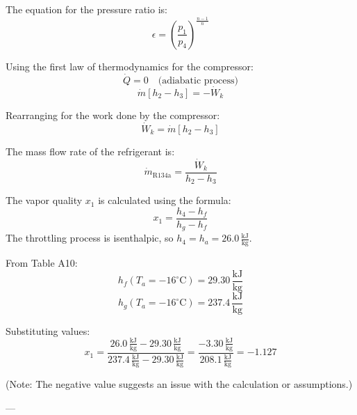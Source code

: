 The equation for the pressure ratio is:  
\[
\epsilon = \left( \frac{p_1}{p_4} \right)^{\frac{n-1}{n}}
\]  

Using the first law of thermodynamics for the compressor:  
\[
\dot{Q} = 0 \quad \text{(adiabatic process)}
\]  
\[
\dot{m} \left[ h_2 - h_3 \right] = -\dot{W}_k
\]  

Rearranging for the work done by the compressor:  
\[
\dot{W}_k = \dot{m} \left[ h_2 - h_3 \right]
\]  

The mass flow rate of the refrigerant is:  
\[
\dot{m}_{\text{R134a}} = \frac{\dot{W}_k}{h_2 - h_3}
\]

The vapor quality \( x_1 \) is calculated using the formula:  
\[
x_1 = \frac{h_4 - h_f}{h_{g} - h_f}
\]  
The throttling process is isenthalpic, so \( h_4 = h_a = 26.0 \, \frac{\text{kJ}}{\text{kg}} \).  

From Table A10:  
\[
h_f(T_a = -16^\circ\text{C}) = 29.30 \, \frac{\text{kJ}}{\text{kg}}
\]  
\[
h_g(T_a = -16^\circ\text{C}) = 237.4 \, \frac{\text{kJ}}{\text{kg}}
\]  

Substituting values:  
\[
x_1 = \frac{26.0 \, \frac{\text{kJ}}{\text{kg}} - 29.30 \, \frac{\text{kJ}}{\text{kg}}}{237.4 \, \frac{\text{kJ}}{\text{kg}} - 29.30 \, \frac{\text{kJ}}{\text{kg}}} = \frac{-3.30 \, \frac{\text{kJ}}{\text{kg}}}{208.1 \, \frac{\text{kJ}}{\text{kg}}} = -1.127
\]  

(Note: The negative value suggests an issue with the calculation or assumptions.)  

---